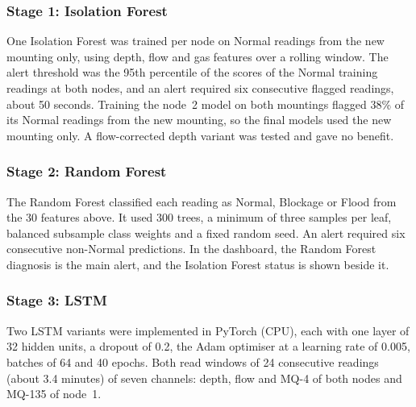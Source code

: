 \documentclass[12pt, a4paper]{article}
\begin{document}
\subsubsection{Stage 1: Isolation Forest}

One Isolation Forest was trained per node on Normal readings from the new mounting only, using depth, flow and gas features over a rolling window. The alert threshold was the 95th percentile of the scores of the Normal training readings at both nodes, and an alert required six consecutive flagged readings, about 50 seconds. Training the node~2 model on both mountings flagged 38\% of its Normal readings from the new mounting, so the final models used the new mounting only. A flow-corrected depth variant was tested and gave no benefit.

\subsubsection{Stage 2: Random Forest}

The Random Forest classified each reading as Normal, Blockage or Flood from the 30 features above. It used 300 trees, a minimum of three samples per leaf, balanced subsample class weights and a fixed random seed. An alert required six consecutive non-Normal predictions. In the dashboard, the Random Forest diagnosis is the main alert, and the Isolation Forest status is shown beside it.

\subsubsection{Stage 3: LSTM}

Two LSTM variants were implemented in PyTorch (CPU), each with one layer of 32 hidden units, a dropout of 0.2, the Adam optimiser at a learning rate of 0.005, batches of 64 and 40 epochs. Both read windows of 24 consecutive readings (about 3.4 minutes) of seven channels: depth, flow and MQ-4 of both nodes and MQ-135 of node~1.
\end{document}
